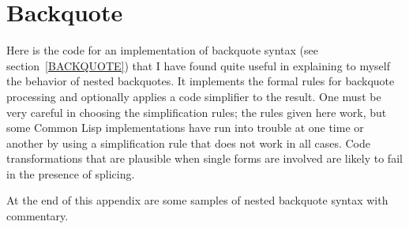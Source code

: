 \clearpage\def\pagestatus{ROUGH PAGES}

\begingroup
\makeatletter
\def\@listi{\leftmargin\leftmargini \labelsep\leftmargin
   \parsep 3pt\relax
   \topsep 4pt plus 10pt\relax
   \itemsep\topsep}
\makeatother

\chapter{Backquote}
\label{BACKQUOTE-SIMULATOR}

\begin{new}
Here is the code for an implementation of backquote syntax
(see section~\ref{BACKQUOTE}) that I have found quite useful
in explaining to myself the behavior of nested backquotes.
It implements the formal rules for backquote processing
and optionally applies a code simplifier to the result.
One must be very careful in choosing the simplification rules;
the rules given here work, but some Common Lisp implementations
have run into trouble at one time or another by using a
simplification rule that does not work in all cases.
Code transformations that are plausible when single forms
are involved are likely to fail in the presence of splicing.

At the end of this appendix are some samples of
nested backquote syntax with commentary.


\end{new}
